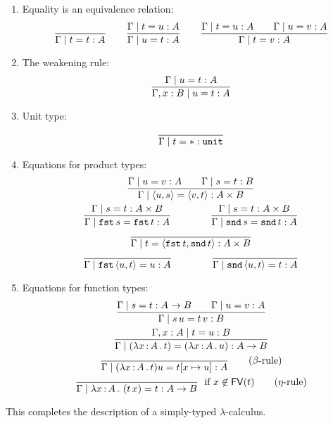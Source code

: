\begin{enumerate}
\item Equality is an equivalence relation:
  \begin{equation*}
    \dfrac{}{\Gamma \mid t = t : A}
    \qquad
    \begin{gathered}\dfrac{\Gamma \mid t = u : A}{\Gamma \mid u = t : A}\end{gathered}
    \qquad
    \begin{gathered}\dfrac{\Gamma \mid t = u : A \qquad
      \Gamma \mid u = v : A
    }{
      \Gamma \mid t = v : A
    }\end{gathered}
  \end{equation*}
\item The weakening rule:
  \begin{equation*}
    \begin{gathered}\dfrac{
      \Gamma \mid u = t : A
    }{
      \Gamma, x : B \mid u = t : A
    }\end{gathered}
  \end{equation*}
\item Unit type:
  \begin{equation*}
    \dfrac{}{\Gamma \mid t = {*} : \mathtt{unit}}
  \end{equation*}
\item Equations for product types:
  \begin{gather*}
    \begin{gathered}\dfrac{\Gamma \mid u = v : A \qquad
      \Gamma \mid s = t : B}{
      \Gamma \mid \langle u, s \rangle = \langle v, t \rangle : A \times B}\end{gathered}
    \\
    \begin{gathered}\dfrac{\Gamma \mid s = t : A \times B}{
      \Gamma \mid \mathtt{fst}\,s = \mathtt{fst}\,t : A}\end{gathered}
    \qquad\qquad
    \begin{gathered}\dfrac{\Gamma \mid s = t : A \times B}{
      \Gamma \mid \mathtt{snd}\,s = \mathtt{snd}\,t : A}\end{gathered}
    \\
    \dfrac{}{\Gamma \mid t = \langle \mathtt{fst}\,t, \mathtt{snd}\,t \rangle : A \times B}
    \\
    \dfrac{}{\Gamma \mid \mathtt{fst}\,\langle u, t \rangle = u : A}
    \qquad\qquad
    \dfrac{}{\Gamma \mid \mathtt{snd}\,\langle u, t \rangle = t : A}
  \end{gather*}
\item Equations for function types:
  \begin{gather*}
    \begin{gathered}\dfrac{\Gamma \mid s = t : A \to B
      \qquad
      \Gamma \mid u = v : A
    }{
      \Gamma \mid s\,u = t\,v : B
    }\end{gathered}
    \\
    \begin{gathered}\dfrac{
      \Gamma, x: A \mid t = u : B
    }{
      \Gamma \mid (\lambda x \,{:}\, A\,.\,t) = (\lambda x \,{:}\, A\,.\,u) : A \to B
    }\end{gathered}
    \\
    \dfrac{}{\Gamma \mid (\lambda x \,{:}\, A\,.\,t) u = t[x \mapsto u] : A}
    \tag{$\beta$-rule}
    \\
    \dfrac{}{\Gamma \mid \lambda x \,{:}\, A\,.\,\left(t\, x\right) = t : A \to B
    } \; \text{\ if $x \not\in \mathsf{FV}(t)$}
    \tag{$\eta$-rule}
  \end{gather*}
\end{enumerate}
%
This completes the description of a simply-typed $\lambda$-calculus.

